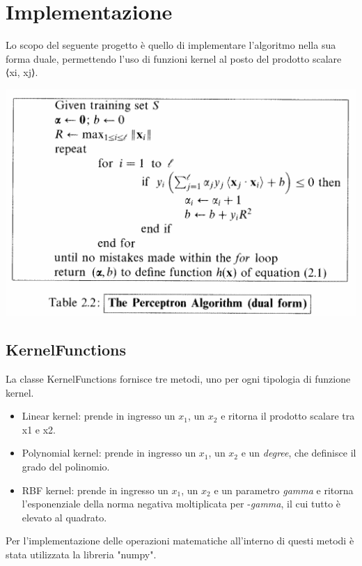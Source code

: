 \documentclass{article}
\begin{document}
	\section{Implementazione} 
	Lo scopo del seguente progetto è quello di implementare l'algoritmo nella sua forma duale, permettendo l'uso di funzioni kernel al posto del prodotto
	scalare ⟨xi, xj⟩.
	\begin{center}
		\includegraphics[width=0.7\linewidth]{pseudocodice_perceptron.png}
		\label{The Perceptron Algorithm (dual form)}
	\end{center}
	\subsection{KernelFunctions}
	La classe KernelFunctions fornisce tre metodi, uno per ogni tipologia di funzione kernel. 
	\begin{itemize}
		\item Linear kernel: prende in ingresso un \textit{$x_1$}, un \textit{$x_2$} e ritorna il prodotto scalare tra x1 e x2.
		\item Polynomial kernel: prende in ingresso un \textit{$x_1$}, un \textit{$x_2$} e un \textit{degree}, che definisce il grado del polinomio. 
		\item RBF kernel: prende in ingresso un \textit{$x_1$}, un \textit{$x_2$} e un parametro \textit{gamma} e ritorna l'esponenziale della norma negativa moltiplicata per -\textit{gamma}, il cui tutto è elevato al quadrato.
	\end{itemize}
	Per l'implementazione delle operazioni matematiche all'interno di questi metodi è stata utilizzata la libreria "numpy".
\end{document}
